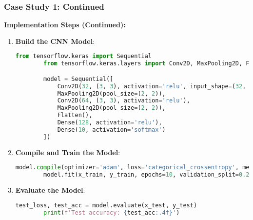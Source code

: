\documentclass[aspectratio=169]{beamer}
\begin{document}
\begin{frame}[fragile]
    \frametitle{Case Study 1: Continued}
    \textbf{Implementation Steps (Continued):}
    \begin{enumerate}[resume]
        \item \textbf{Build the CNN Model}:
        \begin{lstlisting}[language=Python]
        from tensorflow.keras import Sequential
        from tensorflow.keras.layers import Conv2D, MaxPooling2D, Flatten, Dense

        model = Sequential([
            Conv2D(32, (3, 3), activation='relu', input_shape=(32, 32, 3)),
            MaxPooling2D(pool_size=(2, 2)),
            Conv2D(64, (3, 3), activation='relu'),
            MaxPooling2D(pool_size=(2, 2)),
            Flatten(),
            Dense(128, activation='relu'),
            Dense(10, activation='softmax')
        ])
        \end{lstlisting}
        
        \item \textbf{Compile and Train the Model}:
        \begin{lstlisting}[language=Python]
        model.compile(optimizer='adam', loss='categorical_crossentropy', metrics=['accuracy'])
        model.fit(x_train, y_train, epochs=10, validation_split=0.2)
        \end{lstlisting}
        
        \item \textbf{Evaluate the Model}:
        \begin{lstlisting}[language=Python]
        test_loss, test_acc = model.evaluate(x_test, y_test)
        print(f'Test accuracy: {test_acc:.4f}')
        \end{lstlisting}
    \end{enumerate}
\end{frame}
\end{document}
